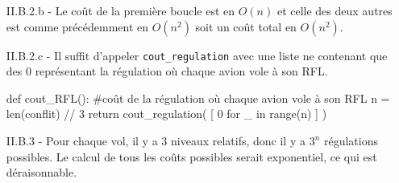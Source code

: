 \begin{itemize}
\item[II.B.2.b - ] Le coût de la premi\`ere boucle est en $O(n)$ et celle des deux autres est comme précédemment en $O(n^2)$ soit un co\^ut total en $O(n^2)$.
 

\item[II.B.2.c - ] Il suffit d'appeler \texttt{cout\_regulation} avec une liste ne contenant que des 0 représentant la régulation où chaque avion vole à son RFL.

\begin{python}
def cout_RFL():
    #coût de la régulation où chaque avion vole à son RFL
    n = len(conflit) // 3
    return cout_regulation( [ 0 for _ in range(n) ] )
\end{python}


\item[II.B.3 - ] Pour chaque vol, il y a $3$ niveaux relatifs, donc il y a $3^n$ r\'egulations possibles. Le calcul de tous les co\^uts possibles serait exponentiel, ce qui est d\'eraisonnable.

\end{itemize}